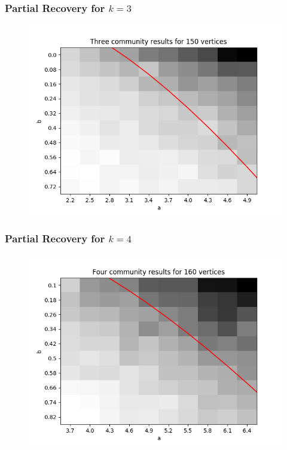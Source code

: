 \documentclass[10pt]{beamer}
\begin{document}
\begin{frame}
\frametitle{Partial Recovery for $k=3$}
\begin{figure}
  \centering
 \includegraphics[scale=.6]{../inexact/final_plots/three_communities_150_verts.png}
\end{figure}
\end{frame}

\begin{frame}
\frametitle{Partial Recovery for $k=4$}
\begin{figure}
  \centering
 \includegraphics[scale=.6]{../inexact/final_plots/four_communities_160_verts.png}
\end{figure}
\end{frame}
\end{document}
